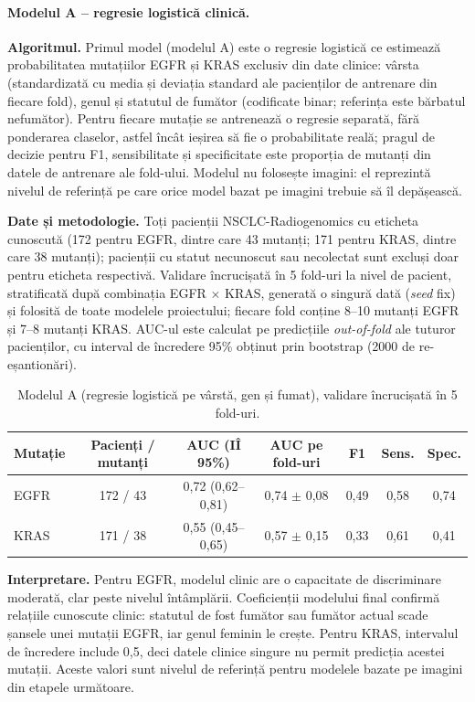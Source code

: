 \documentclass[11pt, a4paper]{article}
\begin{document}
\paragraph{Modelul A -- regresie logistică clinică.}
\textbf{Algoritmul.} Primul model (modelul A) este o regresie logistică ce estimează probabilitatea mutațiilor EGFR și KRAS exclusiv din date clinice: vârsta (standardizată cu media și deviația standard ale pacienților de antrenare din fiecare fold), genul și statutul de fumător (codificate binar; referința este bărbatul nefumător). Pentru fiecare mutație se antrenează o regresie separată, fără ponderarea claselor, astfel încât ieșirea să fie o probabilitate reală; pragul de decizie pentru F1, sensibilitate și specificitate este proporția de mutanți din datele de antrenare ale fold-ului. Modelul nu folosește imagini: el reprezintă nivelul de referință pe care orice model bazat pe imagini trebuie să îl depășească.

\textbf{Date și metodologie.} Toți pacienții NSCLC-Radiogenomics cu eticheta cunoscută (172 pentru EGFR, dintre care 43 mutanți; 171 pentru KRAS, dintre care 38 mutanți); pacienții cu statut necunoscut sau necolectat sunt excluși doar pentru eticheta respectivă. Validare încrucișată în 5 fold-uri la nivel de pacient, stratificată după combinația EGFR $\times$ KRAS, generată o singură dată (\textit{seed} fix) și folosită de toate modelele proiectului; fiecare fold conține 8--10 mutanți EGFR și 7--8 mutanți KRAS. AUC-ul este calculat pe predicțiile \textit{out-of-fold} ale tuturor pacienților, cu interval de încredere 95\% obținut prin bootstrap (2000 de re-eșantionări).

\begin{table}[h]
\centering
\small
\begin{tabular}{@{}lcccccc@{}}
\toprule
\textbf{Mutație} & \textbf{Pacienți / mutanți} & \textbf{AUC (IÎ 95\%)} & \textbf{AUC pe fold-uri} & \textbf{F1} & \textbf{Sens.} & \textbf{Spec.} \\ \midrule
EGFR & 172 / 43 & 0,72 (0,62--0,81) & 0,74 $\pm$ 0,08 & 0,49 & 0,58 & 0,74 \\
KRAS & 171 / 38 & 0,55 (0,45--0,65) & 0,57 $\pm$ 0,15 & 0,33 & 0,61 & 0,41 \\ \bottomrule
\end{tabular}
\caption{Modelul A (regresie logistică pe vârstă, gen și fumat), validare încrucișată în 5 fold-uri.}
\end{table}

\textbf{Interpretare.} Pentru EGFR, modelul clinic are o capacitate de discriminare moderată, clar peste nivelul întâmplării. Coeficienții modelului final confirmă relațiile cunoscute clinic: statutul de fost fumător sau fumător actual scade șansele unei mutații EGFR, iar genul feminin le crește. Pentru KRAS, intervalul de încredere include 0,5, deci datele clinice singure nu permit predicția acestei mutații. Aceste valori sunt nivelul de referință pentru modelele bazate pe imagini din etapele următoare.
\end{document}
